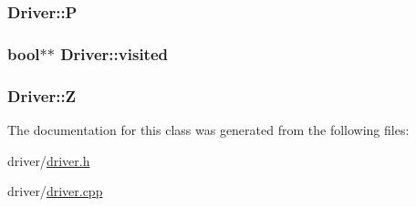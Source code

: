 \subsubsection[{\texorpdfstring{P}{P}}]{ Driver\+::P}\hypertarget{classDriver_a967bca94eece374e66e7ed827f22cf51}{}\label{classDriver_a967bca94eece374e66e7ed827f22cf51}
\subsubsection[{\texorpdfstring{visited}{visited}}]{\setlength{\rightskip}{0pt plus 5cm}bool$\ast$$\ast$ Driver\+::visited}\hypertarget{classDriver_ab338d327140ab7a1a9469d5c16c2697f}{}\label{classDriver_ab338d327140ab7a1a9469d5c16c2697f}
\subsubsection[{\texorpdfstring{Z}{Z}}]{ Driver\+::Z}\hypertarget{classDriver_a15f54a382cba3cdcf82c396cecfa3f9e}{}\label{classDriver_a15f54a382cba3cdcf82c396cecfa3f9e}


The documentation for this class was generated from the following files\+:\begin{DoxyCompactItemize}
\item 
driver/\hyperlink{driver_8h}{driver.\+h}\item 
driver/\hyperlink{driver_8cpp}{driver.\+cpp}\end{DoxyCompactItemize}
